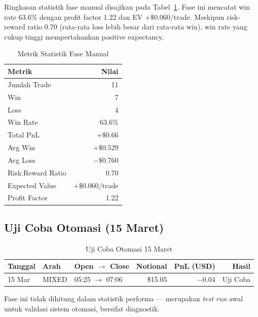 \documentclass[10pt,a4paper]{article}
\begin{document}
Ringkasan statistik fase manual disajikan pada Tabel~\ref{tab:metrics_manual}.
Fase ini mencatat win rate 63.6\% dengan profit factor 1.22 dan EV $+\$0.060$/trade.
Meskipun risk-reward ratio 0.70 (rata-rata loss lebih besar dari rata-rata win),
win rate yang cukup tinggi mempertahankan positive expectancy.

\begin{table}[ht]
\caption{Metrik Statistik Fase Manual}
\label{tab:metrics_manual}
\centering
\small
\begin{tabular}{lr}
\toprule
\textbf{Metrik} & \textbf{Nilai} \\
\midrule
Jumlah Trade        & 11 \\
Win                 & 7 \\
Loss                & 4 \\
Win Rate            & 63.6\% \\
Total PnL           & $+\$0.66$ \\
Avg Win             & $+\$0.529$ \\
Avg Loss            & $-\$0.760$ \\
Risk:Reward Ratio   & 0.70 \\
Expected Value      & $+\$0.060$/trade \\
Profit Factor       & 1.22 \\
\bottomrule
\end{tabular}
\end{table}

\subsection{Uji Coba Otomasi (15 Maret)}
\label{subsec:testrun}

\begin{table}[ht]
\caption{Uji Coba Otomasi 15 Maret}
\label{tab:test_run}
\centering
\small
\begin{tabular}{lllrrr}
\toprule
\textbf{Tanggal} & \textbf{Arah} & \textbf{Open $\to$ Close} & \textbf{Notional} & \textbf{PnL (USD)} & \textbf{Hasil} \\
\midrule
15 Mar & MIXED & 05:25 $\to$ 07:06 & \$15.05 & $-0.04$ & Uji Coba \\
\bottomrule
\end{tabular}
\end{table}

Fase ini tidak dihitung dalam statistik performa — merupakan \emph{test run} awal
untuk validasi sistem otomasi, bersifat diagnostik.
\end{document}

